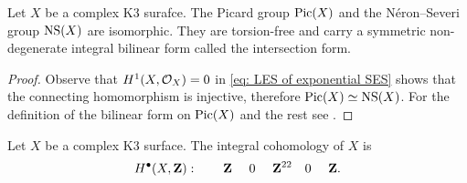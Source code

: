 \begin{proposition}
    \label{picard group torsion free}
    Let $X$ be a complex K3 surafce. The Picard group $\operatorname{Pic}(X)$ and the Néron--Severi group $\operatorname{NS}(X)$ are isomorphic. They are torsion-free and carry a symmetric non-degenerate integral bilinear form called the intersection form. 
\end{proposition}

\begin{proof}
    Observe that $H^{1}(X, {\mathcal{O}_{X}}) = 0$ in \eqref{eq: LES of exponential SES} shows that the connecting homomorphism is injective, therefore $\operatorname{Pic}(X) \simeq \operatorname{NS}(X)$. For the definition of the bilinear form on $\operatorname{Pic}(X)$ and the rest see \cite[\S 1, Proposition 2.4]{Huybrechts2016}.
\end{proof}

\begin{proposition}
    \label{cohomology of K3}
    Let $X$ be a complex K3 surface. The integral cohomology of $X$ is
    \begin{equation}
        \label{eq: cohomology of K3}
        H^{\bullet}(X, \mathbf Z): \qquad \mathbf Z \ \quad 0\ \quad \mathbf Z^{22} \quad 0\ \quad \mathbf Z.
    \end{equation}
\end{proposition}

